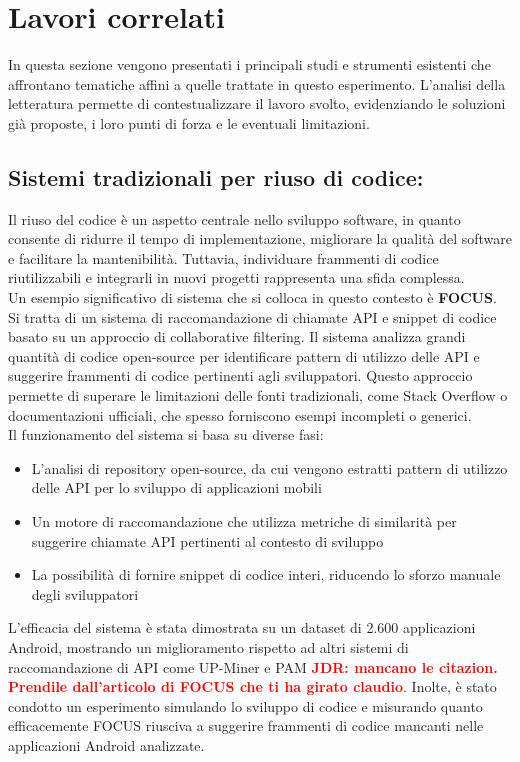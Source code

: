 \documentclass{article}
\newcommand{\JDR}[1]{\textbf{\textcolor{red}{JDR: {#1}}}}
\begin{document}
\section{Lavori correlati}
In questa sezione vengono presentati i principali studi e strumenti esistenti che affrontano tematiche affini a quelle trattate in questo esperimento. L'analisi della letteratura permette di contestualizzare il lavoro svolto, evidenziando le soluzioni già proposte, i loro punti di forza e le eventuali limitazioni.

\subsection{Sistemi tradizionali per riuso di codice:}
Il riuso del codice è un aspetto centrale nello sviluppo software, in quanto consente di ridurre il tempo di implementazione, migliorare la qualità del software e facilitare la mantenibilità. Tuttavia, individuare frammenti di codice riutilizzabili e integrarli in nuovi progetti rappresenta una sfida complessa.\\
Un esempio significativo di sistema che si colloca in questo contesto è \textbf{FOCUS}\cite{nguyen2021recommending}. Si tratta di un sistema di raccomandazione di chiamate API e snippet di codice basato su un approccio di collaborative filtering. Il sistema analizza grandi quantità di codice open-source per identificare pattern di utilizzo delle API e suggerire frammenti di codice pertinenti agli sviluppatori. Questo approccio permette di superare le limitazioni delle fonti tradizionali, come Stack Overflow o documentazioni ufficiali, che spesso forniscono esempi incompleti o generici.\\
Il funzionamento del sistema si basa su diverse fasi:
\begin{itemize}
    \item L’analisi di repository open-source, da cui vengono estratti pattern di utilizzo delle API per lo sviluppo di applicazioni mobili
    \item Un motore di raccomandazione che utilizza metriche di similarità per suggerire chiamate API pertinenti al contesto di sviluppo
    \item La possibilità di fornire snippet di codice interi, riducendo lo sforzo manuale degli sviluppatori
\end{itemize}
L’efficacia del sistema è stata dimostrata su un dataset di 2.600 applicazioni Android, mostrando un miglioramento rispetto ad altri sistemi di raccomandazione di API come UP-Miner e PAM \JDR{mancano le citazion. Prendile dall'articolo di FOCUS che ti ha girato claudio}. Inolte, è stato condotto un esperimento simulando lo sviluppo di codice e misurando quanto efficacemente FOCUS riusciva a suggerire frammenti di codice mancanti nelle applicazioni Android analizzate.\\
\end{document}
